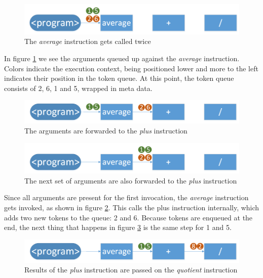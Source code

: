 \begin{figure}[h!]
	\includegraphics[width=\textwidth]{images/Engine-Architecture-1.png}
	\caption{The \textit{average} instruction gets called twice}
	\label{fig:engine-architecture-1}
\end{figure}

In figure \ref{fig:engine-architecture-1} we see the arguments queued up against the \textit{average} instruction. Colors indicate the execution context, being positioned lower and more to the left indicates their position in the token queue. At this point, the token queue consists of 2, 6, 1 and 5, wrapped in meta data. 

\begin{figure}[h!]
	\includegraphics[width=\textwidth]{images/Engine-Architecture-2.png}
	\caption{The arguments are forwarded to the \textit{plus} instruction}
	\label{fig:engine-architecture-2}
\end{figure}

\begin{figure}[h!]
	\includegraphics[width=\textwidth]{images/Engine-Architecture-3.png}
	\caption{The next set of arguments are also forwarded to the \textit{plus} instruction}
	\label{fig:engine-architecture-3}
\end{figure}

Since all arguments are present for the first invocation, the \textit{average} instruction gets invoked, as shown in figure \ref{fig:engine-architecture-2}. This calls the plus instruction internally, which adds two new tokens to the queue: 2 and 6.
Because tokens are enqueued at the end, the next thing that happens in figure \ref{fig:engine-architecture-3} is the same step for 1 and 5.

\begin{figure}[h!]
	\includegraphics[width=\textwidth]{images/Engine-Architecture-4.png}
	\caption{Results of the \textit{plus} instruction are passed on the \textit{quotient} instruction}
	\label{fig:engine-architecture-4}
\end{figure} 

